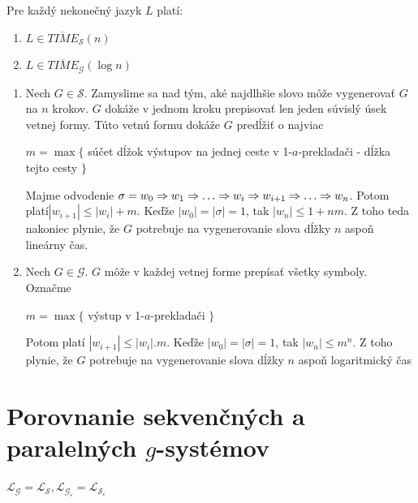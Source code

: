 \begin{veta}
Pre každý nekonečný jazyk $L$ platí:
\begin{enumerate}
\item $L\in\overline{TIME}_{\mathcal{S}}(n)$
\item $L\in\overline{TIME}_{\mathcal{G}}(\log n)$
\end{enumerate}
\end{veta}

\begin{dokaz}
\begin{enumerate}
\item Nech $G\in\mathcal{S}$. Zamyslime sa nad tým, aké najdlhšie
slovo môže vygenerovať $G$ na $n$ krokov. $G$ dokáže v jednom
kroku prepisovať len jeden súvislý úsek vetnej formy. Túto vetnú
formu dokáže $G$ predĺžiť o najviac

\centerline{$m=\max\{$ súčet dĺžok výstupov na jednej ceste v
1-$a$-prekladači - dĺžka tejto cesty $\}$} Majme odvodenie $\sigma
=w_0\Ra w_1\Ra\dots\Ra w_i\Ra w_{i+1}\Ra\dots\Ra w_n$. Potom
platí\linebreak $|w_{i+1}|\leq |w_i| + m$. Keďže $|w_0|=|\sigma
|=1$, tak $|w_n|\leq 1 + nm$. Z toho teda nakoniec plynie, že $G$
potrebuje na vygenerovanie slova dĺžky $n$ aspoň lineárny čas.
\item Nech $G\in\mathcal{G}$. $G$ môže v každej vetnej forme
prepísať všetky symboly. Označme

\centerline{$m=\max\{$ výstup v 1-$a$-prekladači $\}$} Potom platí
$|w_{i+1}|\leq |w_i|.m$. Keďže $|w_0|=|\sigma |=1$, tak $|w_n|\leq
m^n$. Z toho plynie, že $G$ potrebuje na vygenerovanie slova dĺžky
$n$ aspoň logaritmický čas
\end{enumerate}
\end{dokaz}

\section{Porovnanie sekvenčných a paralelných $g$-systémov}
\label{gs_sec_sekvspar}

\begin{veta}
\label{gs_veta_parsek}
$\mathcal{L_G=L_S,L_{G_{\varepsilon}}=L_{S_{\varepsilon}}}$
\end{veta}

